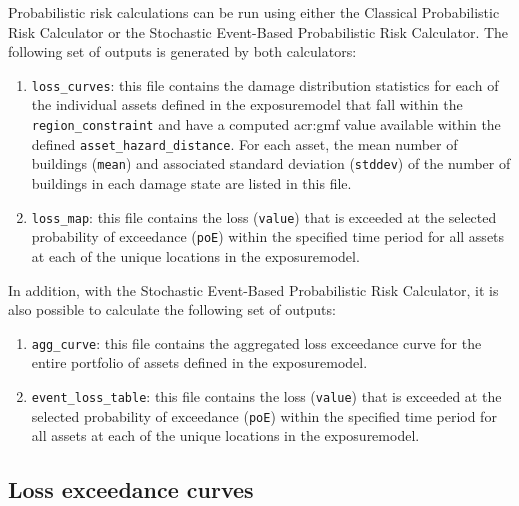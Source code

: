 Probabilistic risk calculations can be run using either the Classical
Probabilistic Risk Calculator or the Stochastic Event-Based Probabilistic Risk
Calculator. The following set of outputs is generated by both calculators:

\begin{enumerate}

  \item \Verb+loss_curves+: this file contains the damage distribution
    statistics for each of the individual \glspl{asset} defined in the
    \gls{exposuremodel} that fall within the \Verb+region_constraint+ and have
    a computed \gls{acr:gmf} value available within the defined
    \Verb+asset_hazard_distance+. For each \gls{asset}, the mean number of
    buildings (\Verb+mean+) and associated standard deviation (\Verb+stddev+)
    of the number of buildings in each damage state are listed in this file.

  \item \Verb+loss_map+: this file contains the loss (\Verb+value+) 
    that is exceeded at the selected probability of exceedance (\Verb+poE+)
    within the specified time period for all \glspl{asset} at each of the unique
    locations in the \gls{exposuremodel}.

\end{enumerate}

In addition, with the Stochastic Event-Based Probabilistic Risk
Calculator, it is also possible to calculate the following set of outputs:

\begin{enumerate}

  \item \Verb+agg_curve+: this file contains the aggregated loss exceedance
    curve for the entire portfolio of \glspl{asset} defined
    in the \gls{exposuremodel}.

  \item \Verb+event_loss_table+: this file contains the loss (\Verb+value+) 
    that is exceeded at the selected probability of exceedance (\Verb+poE+)
    within the specified time period for all \glspl{asset} at each of the unique
    locations in the \gls{exposuremodel}.

\end{enumerate}



\subsection{Loss exceedance curves}
\label{subsec:loss_curves}

